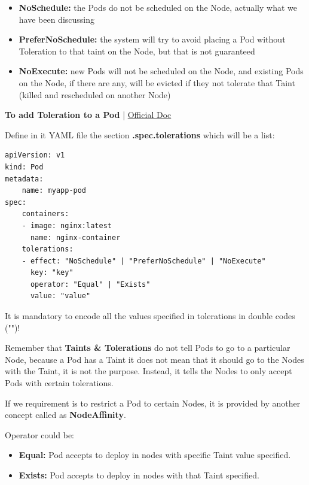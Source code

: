 \documentclass{article}
\newenvironment{blocktemplateII}[1]{%
    \tcolorbox[beamer,%
    noparskip,breakable,
    colframe=Green,%
    colbacklower=LimeGreen!75!LightGreen,%
    title=#1]}%
    {\endtcolorbox}
\newenvironment{blocktemplateIII}[1]{%
    \tcolorbox[beamer,%
    noparskip,breakable,
    ,colframe=Red,%
    colbacklower=LimeGreen!75!LightGreen,%
    title=#1]}%
    {\endtcolorbox}
\newenvironment{codetemplate}[1][]{%
  \mybasecolorbox[#1]
  \itshape
}{%
  \endmybasecolorbox
}
\begin{document}
\begin{itemize}
    \item \textbf{NoSchedule:} the Pods do not be scheduled on the Node, actually what we have been discussing
    \item \textbf{PreferNoSchedule:} the system will try to avoid placing a Pod without Toleration to that taint on the Node, but that is not guaranteed
    \item \textbf{NoExecute:} new Pods will not be scheduled on the Node, and existing Pods on the Node, if there are any, will be evicted if they not tolerate that Taint (killed and rescheduled on another Node)
\end{itemize}

\textbf{To add Toleration to a Pod} | \href{https://kubernetes.io/docs/concepts/scheduling-eviction/taint-and-toleration/}{Official Doc}

Define in it YAML file the section \textbf{.spec.tolerations} which will be a list:

\label{NodeSelector}
\begin{codetemplate}{}
\begin{verbatim}
apiVersion: v1
kind: Pod
metadata:
    name: myapp-pod
spec:
    containers:
    - image: nginx:latest
      name: nginx-container
    tolerations:
    - effect: "NoSchedule" | "PreferNoSchedule" | "NoExecute"
      key: "key" 
      operator: "Equal" | "Exists"
      value: "value"
\end{verbatim}
\end{codetemplate}

\begin{blocktemplateIII}{WARNING}
It is mandatory to encode all the values specified in tolerations in double codes ("")!
\end{blocktemplateIII}

\begin{blocktemplateII}{NOTE 1}
Remember that \textbf{Taints \& Tolerations} do not tell Pods to go to a particular Node, because a Pod has a Taint it does not mean that it should go to the Nodes with the Taint, it is not the purpose. Instead, it tells the Nodes to only accept Pods with certain tolerations.

If we requirement is to restrict a Pod to certain Nodes, it is provided by another concept called as \textbf{NodeAffinity}.
\end{blocktemplateII}

Operator could be:
\begin{itemize}
    \item \textbf{Equal:} Pod accepts to deploy in nodes with specific Taint value specified.
    \item \textbf{Exists:} Pod accepts to deploy in nodes with that Taint specified.
\end{itemize}
\end{document}
